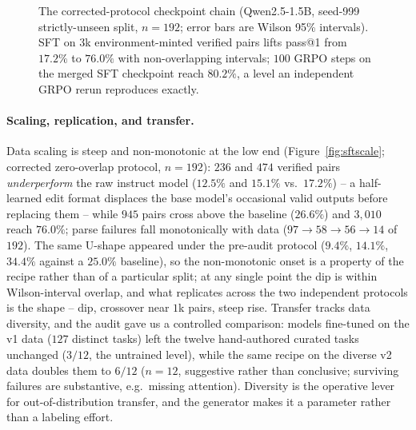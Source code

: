 \documentclass[11pt]{article}
\begin{document}
\begin{figure}[t]
\centering
{}
\caption{The corrected-protocol checkpoint chain (Qwen2.5-1.5B, seed-999 strictly-unseen split, $n{=}192$; error bars are Wilson 95\% intervals). SFT on $3$k environment-minted verified pairs lifts pass@1 from $17.2\%$ to $76.0\%$ with non-overlapping intervals; $100$ GRPO steps on the merged SFT checkpoint reach $80.2\%$, a level an independent GRPO rerun reproduces exactly.}
\label{fig:chain}
\end{figure}

\paragraph{Scaling, replication, and transfer.} Data scaling is steep and non-monotonic at the low end (Figure~\ref{fig:sftscale}; corrected zero-overlap protocol, $n{=}192$): $236$ and $474$ verified pairs \emph{underperform} the raw instruct model ($12.5\%$ and $15.1\%$ vs.\ $17.2\%$) -- a half-learned edit format displaces the base model's occasional valid outputs before replacing them -- while $945$ pairs cross above the baseline ($26.6\%$) and $3{,}010$ reach $76.0\%$; parse failures fall monotonically with data ($97\to58\to56\to14$ of $192$). The same U-shape appeared under the pre-audit protocol ($9.4\%$, $14.1\%$, $34.4\%$ against a $25.0\%$ baseline), so the non-monotonic onset is a property of the recipe rather than of a particular split; at any single point the dip is within Wilson-interval overlap, and what replicates across the two independent protocols is the shape -- dip, crossover near $1$k pairs, steep rise. Transfer tracks data diversity, and the audit gave us a controlled comparison: models fine-tuned on the v1 data ($127$ distinct tasks) left the twelve hand-authored curated tasks unchanged ($3/12$, the untrained level), while the same recipe on the diverse v2 data doubles them to $6/12$ ($n{=}12$, suggestive rather than conclusive; surviving failures are substantive, e.g.\ missing attention). Diversity is the operative lever for out-of-distribution transfer, and the generator makes it a parameter rather than a labeling effort.
\end{document}
